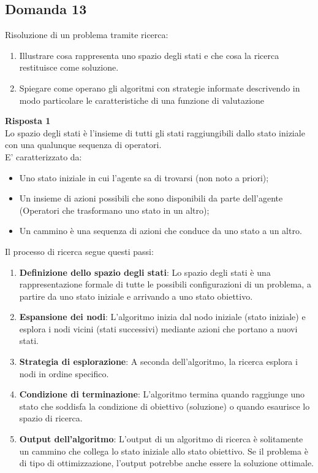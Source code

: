 \documentclass[../main.tex]{subfiles}
\begin{document}
	\subsection{Domanda 13}
	Risoluzione di un problema tramite ricerca:
	\begin{enumerate}
		\item Illustrare cosa rappresenta uno spazio degli stati e che cosa la ricerca restituisce come soluzione. 
		\item Spiegare come operano gli algoritmi con strategie informate descrivendo in modo particolare le caratteristiche di una funzione di valutazione
	\end{enumerate}
	\textbf{Risposta 1}\\
	Lo spazio degli stati è l’insieme di tutti gli stati raggiungibili dallo stato iniziale con una qualunque sequenza di operatori. \\
	E’ caratterizzato da:
	\begin{itemize}
		\item Uno stato iniziale in cui l’agente sa di trovarsi (non noto a priori); 
		\item Un insieme di azioni possibili che sono disponibili da parte dell’agente (Operatori che trasformano uno stato in un altro);
		\item Un cammino è una sequenza di azioni che conduce da uno stato a un altro.
	\end{itemize}
	Il processo di ricerca segue questi passi:
	\begin{enumerate}
		\item \textbf{Definizione dello spazio degli stati}: Lo spazio degli stati è una rappresentazione formale di tutte le possibili configurazioni di un problema, a partire da uno stato iniziale e arrivando a uno stato obiettivo.
		\item \textbf{Espansione dei nodi}: L'algoritmo inizia dal nodo iniziale (stato iniziale) e esplora i nodi vicini (stati successivi) mediante azioni che portano a nuovi stati.
		\item \textbf{Strategia di esplorazione}: A seconda dell'algoritmo, la ricerca esplora i nodi in ordine specifico.
		\item \textbf{Condizione di terminazione}: L'algoritmo termina quando raggiunge uno stato che soddisfa la condizione di obiettivo (soluzione) o quando esaurisce lo spazio di ricerca.
		\item \textbf{Output dell'algoritmo}: L'output di un algoritmo di ricerca è solitamente un cammino che collega lo stato iniziale allo stato obiettivo. Se il problema è di tipo di ottimizzazione, l'output potrebbe anche essere la soluzione ottimale.
	\end{enumerate}
\end{document}
